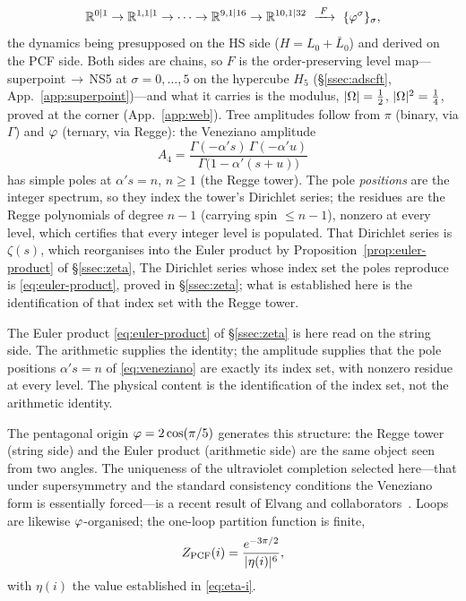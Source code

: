 \begin{equation}\label{eq:HS-tower}
  \mathbb{R}^{0|1}\to\mathbb{R}^{1,1|1}\to\cdots\to\mathbb{R}^{9,1|16}\to\mathbb{R}^{10,1|32}
  \ \xrightarrow{\;F\;}\ \{\varphi^{\sigma}\}_{\sigma},
\end{equation}
the dynamics being presupposed on the HS side ($H=L_{0}+\bar L_{0}$) and derived on the PCF side.
Both sides are chains, so $F$ is the order-preserving level map---superpoint\,$\to$\,NS5 at
$\sigma=0,\dots,5$ on the hypercube $H_5$ (\S\ref{ssec:adscft}, App.~\ref{app:superpoint})---and
what it carries is the modulus, $|\Omega|=\tfrac12$, $|\Omega|^{2}=\tfrac14$, proved at the corner
(App.~\ref{app:web}).
Tree amplitudes follow from $\pi$ (binary, via $\Gamma$) and $\varphi$ (ternary, via Regge): the
Veneziano amplitude \cite{Veneziano}
\begin{equation}\label{eq:veneziano}
  A_{4}=\frac{\Gamma(-\alpha's)\,\Gamma(-\alpha'u)}{\Gamma\!\big(1-\alpha'(s+u)\big)}
\end{equation}
has simple poles at $\alpha's=n$, $n\ge1$ (the Regge tower). The pole \emph{positions} are the integer
spectrum, so they index the tower's Dirichlet series; the residues are the Regge polynomials of
degree $n-1$ (carrying spin $\le n-1$), nonzero at every level, which certifies that every integer
level is populated. That Dirichlet series is $\zeta(s)$, which reorganises into the Euler product by
Proposition~\ref{prop:euler-product} of \S\ref{ssec:zeta},
The Dirichlet series whose index set the poles reproduce is \eqref{eq:euler-product}, proved in
\S\ref{ssec:zeta}; what is established here is the identification of that index set with the
Regge tower.

\begin{remark}\label{rmk:tower-euler}
The Euler product \eqref{eq:euler-product} of \S\ref{ssec:zeta} is here read on
the string side. The arithmetic supplies the identity; the amplitude supplies that the pole positions
$\alpha's=n$ of \eqref{eq:veneziano} are exactly its index set, with nonzero residue at every level.
The physical content is the identification of the index set, not the arithmetic identity.

\end{remark}

The pentagonal origin $\varphi=2\cos(\pi/5)$ generates this structure: the Regge
tower (string side) and the Euler product (arithmetic side) are the same object seen from
two angles. The uniqueness of the ultraviolet completion selected here---that under
supersymmetry and the standard consistency conditions the Veneziano form is essentially
forced---is a recent result of Elvang and collaborators~\cite{Elvang2026}.
Loops are likewise $\varphi$-organised; the one-loop partition function is finite,
\begin{equation}\label{eq:pcf-partition}
  Z_{\mathrm{PCF}}(i)=\frac{e^{-3\pi/2}}{|\eta(i)|^{6}},
\end{equation}
with $\eta(i)$ the value established in \eqref{eq:eta-i}.

